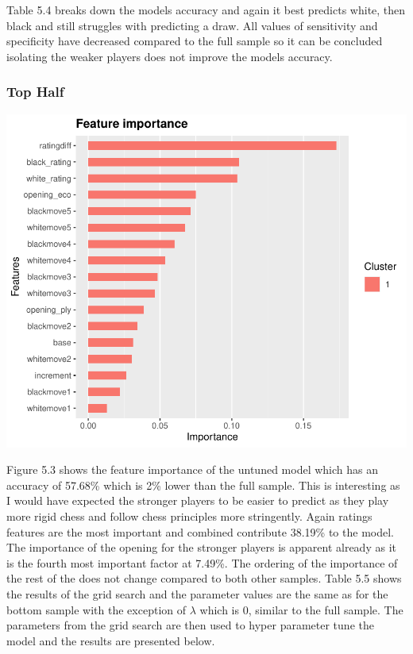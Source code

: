 \documentclass[12pt,preprint, authoryear]{elsarticle}
\let\origfigure\figure
\let\endorigfigure\endfigure
\renewenvironment{figure}[1][2] {
    \expandafter\origfigure\expandafter[H]
} {
    \endorigfigure
}
\numberwithin{equation}{section}
\numberwithin{figure}{section}
\numberwithin{table}{section}
\begin{document}
Table 5.4 breaks down the models accuracy and again it best predicts
white, then black and still struggles with predicting a draw. All values
of sensitivity and specificity have decreased compared to the full
sample so it can be concluded isolating the weaker players does not
improve the models accuracy.

\hypertarget{top-half}{%
\subsubsection{Top Half}\label{top-half}}

\begin{figure}[H]

{\centering \includegraphics{WriteUp_files/figure-latex/impoerancehigh1-1} 

}

\caption{Feature Importance Untuned Model: Top Half\label{Figure13}}\label{fig:impoerancehigh1}
\end{figure}

Figure 5.3 shows the feature importance of the untuned model which has
an accuracy of 57.68\% which is 2\% lower than the full sample. This is
interesting as I would have expected the stronger players to be easier
to predict as they play more rigid chess and follow chess principles
more stringently. Again ratings features are the most important and
combined contribute 38.19\% to the model. The importance of the opening
for the stronger players is apparent already as it is the fourth most
important factor at 7.49\%. The ordering of the importance of the rest
of the does not change compared to both other samples. Table 5.5 shows
the results of the grid search and the parameter values are the same as
for the bottom sample with the exception of \(\lambda\) which is 0,
similar to the full sample. The parameters from the grid search are then
used to hyper parameter tune the model and the results are presented
below.
\end{document}
